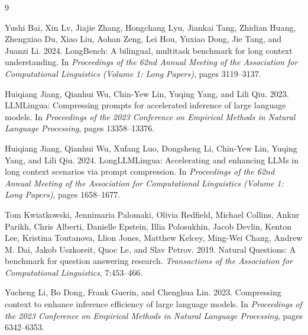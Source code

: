 ﻿\documentclass[10pt,a4paper,twocolumn]{article}
\begin{document}
\begin{thebibliography}{9}

Yushi Bai, Xin Lv, Jiajie Zhang, Hongchang Lyu, Jiankai Tang, Zhidian Huang, Zhengxiao Du, Xiao Liu, Aohan Zeng, Lei Hou, Yuxiao Dong, Jie Tang, and Juanzi Li. 2024.
\newblock LongBench: A bilingual, multitask benchmark for long context understanding.
\newblock In \emph{Proceedings of the 62nd Annual Meeting of the Association for Computational Linguistics (Volume 1: Long Papers)}, pages 3119--3137.

Huiqiang Jiang, Qianhui Wu, Chin-Yew Lin, Yuqing Yang, and Lili Qiu. 2023.
\newblock LLMLingua: Compressing prompts for accelerated inference of large language models.
\newblock In \emph{Proceedings of the 2023 Conference on Empirical Methods in Natural Language Processing}, pages 13358--13376.

Huiqiang Jiang, Qianhui Wu, Xufang Luo, Dongsheng Li, Chin-Yew Lin, Yuqing Yang, and Lili Qiu. 2024.
\newblock LongLLMLingua: Accelerating and enhancing LLMs in long context scenarios via prompt compression.
\newblock In \emph{Proceedings of the 62nd Annual Meeting of the Association for Computational Linguistics (Volume 1: Long Papers)}, pages 1658--1677.

Tom Kwiatkowski, Jennimaria Palomaki, Olivia Redfield, Michael Collins, Ankur Parikh, Chris Alberti, Danielle Epstein, Illia Polosukhin, Jacob Devlin, Kenton Lee, Kristina Toutanova, Llion Jones, Matthew Kelcey, Ming-Wei Chang, Andrew M. Dai, Jakob Uszkoreit, Quoc Le, and Slav Petrov. 2019.
\newblock Natural Questions: A benchmark for question answering research.
\newblock \emph{Transactions of the Association for Computational Linguistics}, 7:453--466.

Yucheng Li, Bo Dong, Frank Guerin, and Chenghua Lin. 2023.
\newblock Compressing context to enhance inference efficiency of large language models.
\newblock In \emph{Proceedings of the 2023 Conference on Empirical Methods in Natural Language Processing}, pages 6342--6353.


\end{thebibliography}
\end{document}
